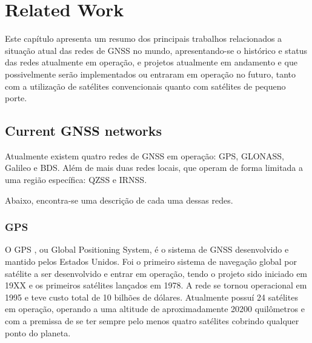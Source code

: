%
%
%
%
%

%
%
%
%
%


\chapter{Related Work} \label{ch:related-work}

Este capítulo apresenta um resumo dos principais trabalhos relacionados a situação atual das redes de GNSS no mundo, apresentando-se o histórico e status das redes atualmente em operação, e projetos atualmente em andamento e que possivelmente serão implementados ou entraram em operação no futuro, tanto com a utilização de satélites convencionais quanto com satélites de pequeno porte.

\section{Current GNSS networks}

Atualmente existem quatro redes de GNSS em operação: GPS, GLONASS, Galileo e BDS. Além de mais duas redes locais, que operam de forma limitada a uma região específica: QZSS e IRNSS.

Abaixo, encontra-se uma descrição de cada uma dessas redes.

\subsection{GPS}

O GPS \cite{gps}, ou Global Positioning System, é o sistema de GNSS desenvolvido e mantido pelos Estados Unidos. Foi o primeiro sistema de navegação global por satélite a ser desenvolvido e entrar em operação, tendo o projeto sido iniciado em 19XX e os primeiros satélites lançados em 1978. A rede se tornou operacional em 1995 e teve custo total de 10 bilhões de dólares. Atualmente possuí 24 satélites em operação, operando a uma altitude de aproximadamente 20200 quilômetros e com a premissa de se ter sempre pelo menos quatro satélites cobrindo qualquer ponto do planeta.

